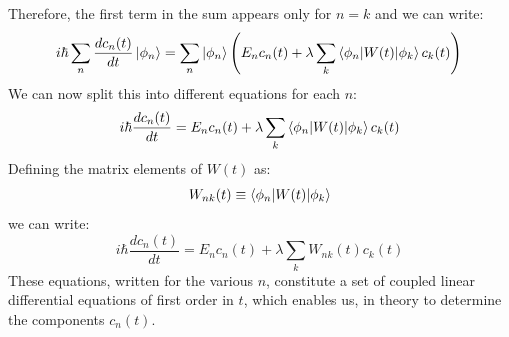 Therefore, the first term in the sum appears only for $n=k$ and we can write:
\begin{equation}
    i\hbar \sum_n\frac{dc_n(t)}{dt} \ket{\phi_n} = \sum_n \ket{\phi_n} \left(E_nc_n(t) + \lambda\sum_k \braket{\phi_n|W(t)|\phi_k}c_k(t) \right)\\
\end{equation}
We can now split this into different equations for each $n$:
\begin{equation}
    i\hbar \frac{dc_n(t)}{dt} = E_nc_n(t) + \lambda\sum_{k} \braket{\phi_n| W(t)|\phi_k}c_k(t)
\end{equation}
Defining the matrix elements of $W(t)$ as:
\begin{equation}
    W_{nk}(t) \equiv \braket{\phi_n| W(t)|\phi_k}
\end{equation}
we can write:
\begin{equation}\label{eq:time_dependent_perturbation_1}
    i\hbar \frac{dc_n(t)}{dt} = E_nc_n(t) + \lambda\sum_{k} W_{nk}(t)c_k(t)
\end{equation}
These equations, written for the various $n$, constitute a set of coupled linear differential equations of first order in $t$, which enables us, in theory to determine the components $c_n(t)$.

